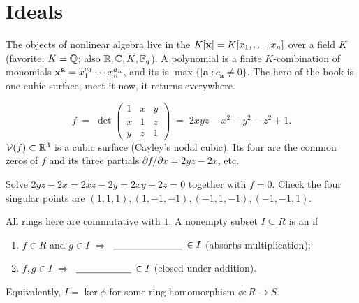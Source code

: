 \section{Ideals}\label{sec:ideals}
\quad{}

\begin{strand}
The objects of nonlinear algebra live in the 
$K[\xb]=K[x_1,\dots,x_n]$ over a field $K$ (favorite: $K=\Q$; also $\R,\C,\overline K,
\mathbb F_q$). A polynomial is a finite $K$-combination of monomials $\xb^{\mathbf a}
=x_1^{a_1}\cdots x_n^{a_n}$, and its  is $\max\{|\mathbf a|:c_{\mathbf a}\ne0\}$.
The hero of the book is one cubic surface; meet it now, it returns everywhere.
\end{strand}

\begin{example}[the running cubic, $n=3$]\label{ex:cayley}
\[
  f \;=\; \det\!\begin{pmatrix}1&x&y\\ x&1&z\\ y&z&1\end{pmatrix}
    \;=\; 2xyz-x^2-y^2-z^2+1 .
\]
$\V(f)\subset\R^3$ is a cubic surface (Cayley's nodal cubic). Its four 
are the common zeros of $f$ and its three partials $\partial f/\partial x=2yz-2x$, etc.
\end{example}
\begin{yourturn}
Solve $2yz-2x=2xz-2y=2xy-2z=0$ together with $f=0$. Check the four singular points are
$(1,1,1),(1,-1,-1),(-1,1,-1),(-1,-1,1)$. 
\workspace[3]
\end{yourturn}


\begin{definition}\label{def:ideal}
All rings here are commutative with $1$. A nonempty subset $I\subseteq R$ is an  if
\begin{enumerate}[label=(\alph*),leftmargin=2em,itemsep=0pt]
  \item $f\in R$ and $g\in I$ \;$\Rightarrow$\; $\fillin[2.5cm]\in I$ \quad(absorbs multiplication);
  \item $f,g\in I$ \;$\Rightarrow$\; $\fillin[2cm]\in I$ \quad(closed under addition).
\end{enumerate}
Equivalently, $I=\ker\phi$ for some ring homomorphism $\phi:R\to S$.
\end{definition}

